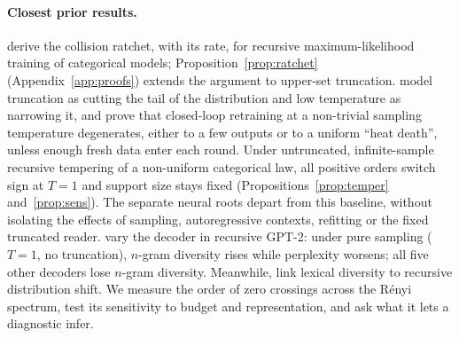 \documentclass[10pt]{article}
\theoremstyle{plain}
\theoremstyle{definition}
\begin{document}
\paragraph{Closest prior results.} \citet{seddik2024howbad} derive the collision ratchet, with
its rate, for recursive maximum-likelihood training of categorical models;
Proposition~\ref{prop:ratchet} (Appendix~\ref{app:proofs}) extends the argument to upper-set
truncation. \citet{dohmatob2024} model truncation as cutting the tail of the distribution and
low temperature as narrowing it, and \citet{marchi2024heat} prove that closed-loop retraining at a
non-trivial sampling temperature degenerates, either to a few outputs or to a uniform ``heat
death'', unless enough fresh data enter each round. Under untruncated, infinite-sample recursive tempering of a
non-uniform categorical law, all positive orders switch sign at $T=1$ and support size stays
fixed (Propositions~\ref{prop:temper} and~\ref{prop:sens}). The separate neural roots depart
from this baseline, without isolating the effects of sampling, autoregressive contexts,
refitting or the fixed truncated reader.
\citet{drayson2025detection} vary the decoder
in recursive GPT-2: under pure sampling ($T=1$, no truncation), $n$-gram diversity rises while
perplexity worsens; all five other decoders lose $n$-gram diversity. Meanwhile,
\citet{kovac2025} link lexical diversity to recursive distribution shift. We measure the order
of zero crossings across the R\'enyi spectrum, test its
sensitivity to budget and representation, and ask what it lets a diagnostic infer.
\end{document}
